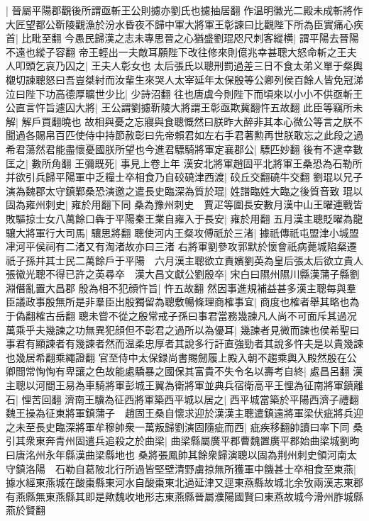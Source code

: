 |{
	晉屬平陽郡觀後所謂亟斬王公則攄亦劉氏也攄抽居翻}
作温明徽光二殿未成斬將作大匠望都公靳陵觀漁於汾水昏夜不歸中軍大將軍王彰諫曰比觀陛下所為臣實痛心疾首|{
	比毗至翻}
今愚民歸漢之志未專思晉之心猶盛劉琨咫尺刺客縱横|{
	謂平陽去晉陽不遠也縱子容翻}
帝王輕出一夫敵耳願陛下改往修來則億兆幸甚聰大怒命斬之王夫人叩頭乞哀乃囚之|{
	王夫人彰女也}
太后張氏以聰刑罰過差三日不食太弟义單于粲輿櫬切諫聰怒曰吾豈桀紂而汝輩生來哭人太宰延年太保殷等公卿列侯百餘人皆免冠涕泣曰陛下功高德厚曠世少比|{
	少詩沼翻}
往也唐虞今則陛下而頃來以小小不供亟斬王公直言忤旨遽囚大將|{
	王公謂劉攄靳陵大將謂王彰亟欺冀翻忤五故翻}
此臣等竊所未解|{
	解戶買翻曉也}
故相與憂之忘寢與食聰慨然曰朕昨大醉非其本心微公等言之朕不聞過各賜帛百匹使侍中持節赦彰曰先帝賴君如左右手君著勲再世朕敢忘之此段之過希君蕩然君能盡懷憂國朕所望也今進君驃騎將軍定襄郡公|{
	驃匹妙翻}
後有不逮幸數匡之|{
	數所角翻}
王彌既死|{
	事見上卷上年}
漢安北將軍趙固平北將軍王桑恐為石勒所并欲引兵歸平陽軍中乏糧士卒相食乃自䂭磽津西渡|{
	䂭丘交翻磽牛交翻}
劉琨以兄子演為魏郡太守鎮鄴桑恐演邀之遣長史臨深為質於琨|{
	姓譜臨姓大臨之後質音致}
琨以固為雍州刺史|{
	雍於用翻下同}
桑為豫州刺史　賈疋等圍長安數月漢中山王曜連戰皆敗驅掠士女八萬餘口犇于平陽秦王業自雍入于長安|{
	雍於用翻}
五月漢主聰貶曜為龍驤大將軍行大司馬|{
	驤思將翻}
聰使河内王粲攻傅祇於三渚|{
	據祇傳祇屯盟津小城盟冿河平侯祠有二渚又有淘渚故亦曰三渚}
右將軍劉參攻郭默於懷會祇病薨城陷粲遷祇子孫并其士民二萬餘戶于平陽　六月漢主聰欲立責嬪劉英為皇后張太后欲立貴人張徽光聰不得已許之英尋卒　漢大昌文獻公劉殷卒|{
	宋白曰隰州隰川縣漢蒲子縣劉淵僭亂置大昌郡}
殷為相不犯顔忤旨|{
	忤五故翻}
然因事進規補益甚多漢主聰每與羣臣議政事殷無所是非羣臣出殷獨留為聰敷暢條理商榷事宜|{
	商度也榷者舉其略也為于偽翻榷古岳翻}
聰未嘗不從之殷常戒子孫曰事君當務幾諫凡人尚不可面斥其過况萬乘乎夫幾諫之功無異犯顔但不彰君之過所以為優耳|{
	幾諫者見微而諫也侯希聖曰事君有顯諫者有幾諫者然而温柔忠厚者其說多行訐直強勁者其說多忤夫是以貴幾諫也幾居希翻乘繩證翻}
官至侍中太保録尚書賜劒履上殿入朝不趨乘輿入殿然殷在公卿間常恂恂有卑讓之色故能處驕暴之國保其富貴不失令名以壽考自終|{
	處昌呂翻}
漢主聰以河間王易為車騎將軍彭城王翼為衛將軍並典兵宿衛高平王悝為征南將軍鎮離石|{
	悝苦回翻}
濟南王驥為征西將軍築西平城以居之|{
	西平城當築於平陽西濟子禮翻}
魏王操為征東將軍鎮蒲子　趙固王桑自懷求迎於漢漢主聰遣鎮遠將軍梁伏疵將兵迎之未至長史臨深將軍牟穆帥衆一萬叛歸劉演固隨疵而西|{
	疵疾移翻帥讀曰率下同}
桑引其衆東奔青州固遣兵追殺之於曲梁|{
	曲梁縣屬廣平郡曹魏置廣平郡始曲梁城劉昫曰唐洺州永年縣漢曲梁縣地也}
桑將張鳳帥其餘衆歸演聰以固為荆州刺史領河南太守鎮洛陽　石勒自葛陂北行所過皆堅壁清野虜掠無所獲軍中饑甚士卒相食至東燕|{
	據水經東燕城在酸棗縣東河水自酸棗東北過延津又逕東燕縣故城北余攷兩漢志東郡有燕縣無東燕縣其即是歟魏收地形志東燕縣晉屬濮陽國賢曰東燕故城今滑州胙城縣燕於賢翻}
